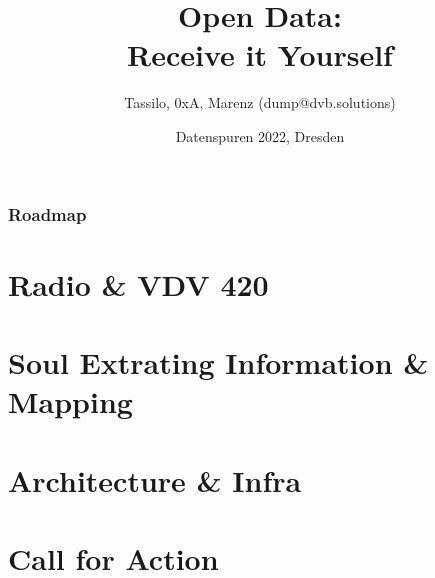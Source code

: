 \documentclass[aspectratio=169]{beamer}
\title{Open Data: \\ Receive it Yourself}
\date[ISPN ’80]{Datenspuren 2022, Dresden}
\author[]{Tassilo, 0xA, Marenz (dump@dvb.solutions)}
\begin{document}
\begin{frame}\titlepage
\end{frame}
  
\begin{frame} 
\frametitle{Roadmap} 

\tableofcontents

\end{frame}


\section{Radio \& VDV 420}





\section{Soul Extrating Information \& Mapping }





\section{Architecture \& Infra }





\section{Call for Action}

\end{document}
